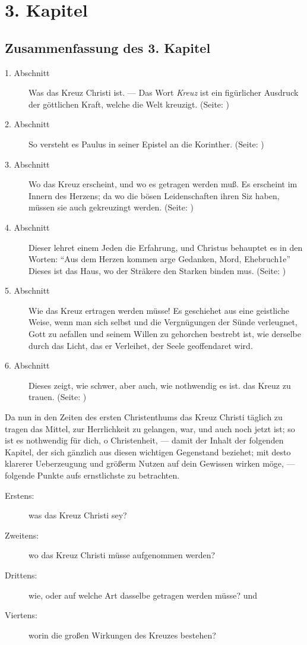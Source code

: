 
\chapter{3. Kapitel} \label{kap3}

\section{Zusammenfassung des 3. Kapitel}

\footnotesize
\begin{description}
\item[1. Abschnitt] Was das Kreuz Christi ist. — Das Wort \textit{Kreuz} ist ein
figürlicher Ausdruck der göttlichen Kraft, welche die Welt kreuzigt.
(Seite: \pageref{kap3_ab1})
\item[2. Abschnitt] So versteht es Paulus in seiner Epistel an die
Korinther. (Seite: \pageref{kap3_ab2})
\item[3. Abschnitt] Wo das Kreuz erscheint, und wo es getragen werden muß. Es
erscheint im Innern des Herzens; da wo die bösen Leidenschaften ihren Siz haben,
müssen sie auch gekreuzingt werden. (Seite: \pageref{kap3_ab3})
\item[4. Abschnitt] Dieser lehret einem Jeden die Erfahrung, und Christus
behauptet es in den Worten: "`Aus dem Herzen kommen arge Gedanken, Mord,
Ehebruch1e"' Dieses ist das Haus, wo der Sträkere den Starken binden mus.
(Seite: \pageref{kap3_ab4})
\item[5. Abschnitt] Wie das Kreuz ertragen werden müsse! Es geschiehet aus eine
geistliche Weise, wenn man sich selbst und die Vergnügungen der Sünde
verleugnet, Gott zu aefallen und seinem Willen zu gehorchen bestrebt ist, wie
derselbe durch das Licht, das er Verleihet, der Seele geoffendaret wird.
\item[6. Abschnitt] Dieses zeigt, wie schwer, aber auch, wie nothwendig es ist.
das Kreuz zu trauen. (Seite: \pageref{kap3_ab5})
\end{description}
\normalsize

Da nun in den Zeiten des ersten Christenthums das Kreuz Christi täglich zu
tragen das Mittel, zur Herrlichkeit zu gelangen, war, und auch noch jetzt ist;
so ist es nothwendig für dich, o Christenheit, — damit der Inhalt der folgenden
Kapitel, der sich gänzlich aus diesen wichtigen Gegenstand beziehet; mit desto
klarerer Ueberzeugung und größerm Nutzen auf dein Gewissen wirken möge, —
folgende Punkte aufs ernstlichste zu betrachten.
\begin{description}
\item[Erstens:] was das Kreuz Christi sey?
\item[Zweitens:] wo das Kreuz Christi müsse aufgenommen werden?
\item[Drittens:] wie, oder auf welche Art dasselbe getragen werden müsse? und
\item[Viertens:] worin die großen Wirkungen des Kreuzes bestehen?
\end{description}

